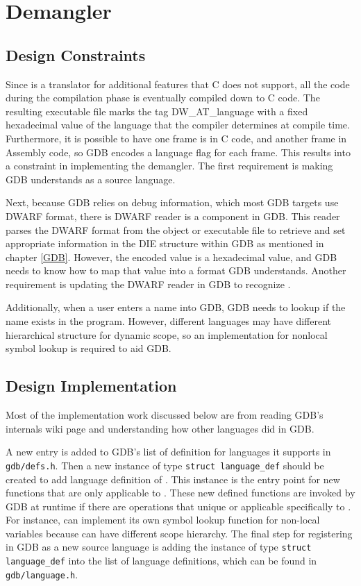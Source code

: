\chapter{\CFAS Demangler} \label{demangler}

\section{Design Constraints}
Since \CFAS is a translator for additional features that C does not support, all
the code during the compilation phase is eventually compiled down to C code.
The resulting executable file marks the tag DW\_AT\_language with a
fixed hexadecimal value of the language that the compiler determines at compile
time. Furthermore, it is possible to have one frame is in C code, and another
frame in Assembly code, so GDB encodes a language flag for each frame. This
results into a constraint in implementing the demangler. The first requirement is
making GDB understands \CFAS as a source language.

Next, because GDB relies on debug information, which most GDB targets use DWARF
format, there is DWARF reader is a component in GDB. This reader parses the DWARF format from the object or
executable file to retrieve and set
appropriate information in the DIE structure within GDB as mentioned in chapter
\ref{GDB}. However, the encoded value is a hexadecimal value, and GDB needs to
know how to map that value into a format GDB understands.
Another requirement is updating the DWARF reader in GDB to recognize \CFA.

Additionally, when a user enters a name into GDB, GDB needs to lookup if the
name exists in the program. However, different languages may have different
hierarchical structure for dynamic scope, so an implementation for nonlocal
symbol lookup is required to aid GDB.

\section{Design Implementation}
Most of the implementation work discussed below are from reading GDB's internals
wiki page and understanding how other languages did in GDB\cite{reference}.

A new entry is added to GDB's list of definition for languages it supports in
\verb|gdb/defs.h|. Then a new instance of type \verb|struct language_def|
should be created to add language definition of \CFAS. This instance is the
entry point for new functions that are only applicable to \CFA. These new
defined functions are invoked by GDB at runtime if there are operations that
unique or applicable specifically to \CFA. For instance, \CFAS can implement its
own symbol lookup function for non-local variables because \CFAS can have
different scope hierarchy. The final step for registering \CFAS in GDB as a new
source language is adding the instance of type \verb|struct language_def| into
the list of language definitions, which can be found in
\verb|gdb/language.h|.


